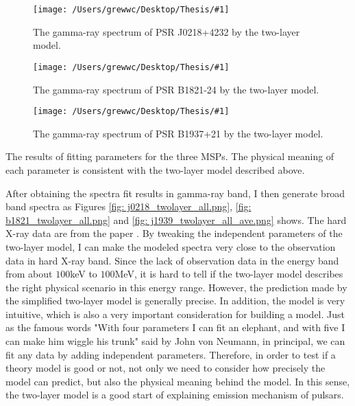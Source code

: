 \documentclass[12pt]{report}
\newcommand{\mycaption}[1]{\protect \caption{#1}}
\newcommand{\singleFig}[3]{
  \begin{figure}[!htp]
    \centering
    \texttt{[image: /Users/grewwc/Desktop/Thesis/\#1]}
    \caption{#3}
    \label{fig: #1}
  \end{figure}
}
\newcommand{\change}[1]{
  $<$\colorbox{red}{\textbf{change}}$>$#1$<$\colorbox{red}{\textbf{/change}}$>$
}
\newcommand{\mayChange}[1]{
  $<$\colorbox{red}{\textbf{mayChange}}$>$#1$<$\colorbox{red}{\textbf{/mayChange}}$>$
}
\begin{document}
        \singleFig{j0218_twolayer_cur.png}{0.37}{The gamma-ray spectrum of PSR J0218+4232 by 
          the two-layer model.}
        \singleFig{b1821_twolayer_cur.png}{0.37}{The gamma-ray spectrum of PSR B1821-24 by 
          the two-layer model.}
        \singleFig{j1939_twolayer_cur.png}{0.38}{The gamma-ray spectrum of PSR B1937+21 by 
          the two-layer model.}

        
        \begin{table}[!htp]
          \centering
          \mycaption{The results of fitting parameters for the three MSPs. The physical 
            meaning of each parameter is consistent with the two-layer model described above.}
          \label{table: twolayer_fit_parameter}
        \end{table}
        \vspace{0.5cm}
          
        After obtaining the spectra fit results in gamma-ray band, I then generate broad band 
        spectra as Figures \ref{fig: j0218_twolayer_all.png}, \ref{fig: b1821_twolayer_all.png}
        and \ref{fig: j1939_twolayer_all_ave.png} shows. 
        The hard X-ray data are from the paper \cite{0004-637X-845-2-159}. By tweaking the 
        independent parameters of the two-layer model, I can make the modeled spectra very 
        close to the observation data in hard X-ray band. Since the lack of observation data in 
        the energy band from about $100$keV to $100$MeV, it is hard to tell if the two-layer model 
        describes the right physical scenario in this energy range. However, the prediction made 
        by the simplified two-layer model is generally precise. In addition, the model is very 
        intuitive, which is also a very important consideration for building a model. Just as 
        the famous words "With four parameters I can fit an elephant, and with five I 
        can make him wiggle his trunk" 
        said by John von Neumann, in principal, we can fit any data by adding independent 
        parameters. Therefore, in order to test if a theory model is good or not, not only we 
        need to consider how precisely the model can predict, but also the physical meaning 
        behind the model. In this sense, the two-layer model is a good start of explaining 
        emission mechanism of pulsars. 
          
\end{document}
